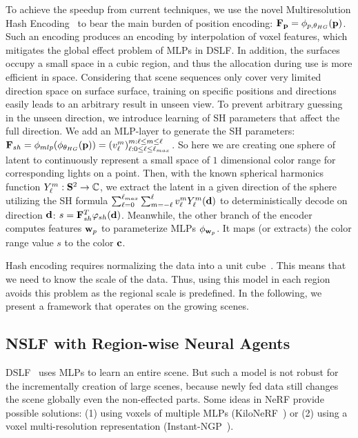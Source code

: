 To achieve the speedup from current techniques, we use the novel Multiresolution Hash Encoding~\cite{muller2022instant} to bear the main burden of position encoding:
$\mathbf F_{\mathbf p}=\phi_{p,\theta_{HG}}(\mathbf p)$.
Such an encoding produces an encoding by interpolation of voxel features, which mitigates the global effect problem of MLPs in DSLF.
In addition, the surfaces occupy a small space in a cubic region, and thus the allocation during use is more efficient in space.
%
Considering that scene sequences only cover very limited direction space on surface surface, training on specific positions and directions easily leads to an arbitrary result in unseen view.
To prevent arbitrary guessing in the unseen direction, we introduce learning of SH parameters that affect the full direction.
We add an MLP-layer to generate the SH parameters: $\mathbf F_{sh} = \phi_{mlp}(\phi_{\theta_{HG}}(\mathbf p))=(v_\ell ^m)_{\ell: 0\leq \ell \leq \ell_{max}}^{m:\ell \leq m\leq \ell}$.
So here we are creating one sphere of latent to continuously represent a small space of $1$ dimensional color range for corresponding lights on a point. %
%
Then, with the known spherical harmonics function $Y_\ell ^m: \mathbf S^2\rightarrow \mathbb C$, we extract the latent in a given direction of the sphere
utilizing the SH formula 
$\sum_{\ell =0}^{\ell _{max}}\sum_{m=-\ell }^{\ell } v^{m}_\ell  Y_\ell ^m(\mathbf d)$ to deterministically decode on direction $\mathbf d$:  $ s = \mathbf F_{sh}^{T} \varphi_{sh}(\mathbf d)$.
Meanwhile, the other branch of the encoder computes features $\mathbf w_p$ to parameterize MLPs $\phi _{\mathbf w_p}$. It maps (or extracts) the color range value $s$ to the color $\mathbf c$.

Hash encoding requires normalizing the data into a unit cube~\cite{muller2022instant}. 
This means that we need to know the scale of the data.
Thus, using this model in each region avoids this problem as the regional scale is predefined.
In the following, we present a framework that operates on the growing scenes.

\subsection{NSLF with Region-wise Neural Agents}

DSLF~\cite{chen2018deep} uses MLPs to learn an entire scene.
But such a model is not robust for the incrementally creation of large scenes, because newly fed data still changes the scene globally even the non-effected parts. 
%
Some ideas in NeRF provide possible solutions:
(1) using voxels of multiple MLPs (KiloNeRF~\cite{reiser2021kilonerf}) or
(2) using a voxel multi-resolution representation (Instant-NGP~\cite{muller2022instant}).

